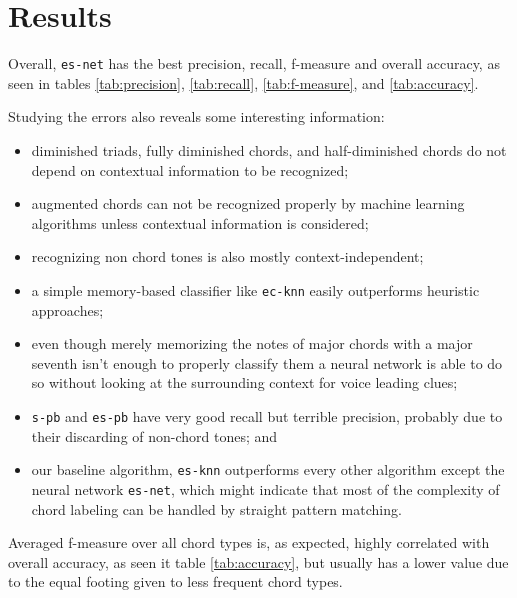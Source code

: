 \documentclass{article}
\begin{document}
\section{Results}
\label{sec:discussion}


Overall, \texttt{es-net} has the best precision, recall, f-measure and
overall accuracy, as seen in tables \ref{tab:precision},
\ref{tab:recall}, \ref{tab:f-measure}, and \ref{tab:accuracy}.

Studying the errors also reveals some interesting information:
\begin{itemize}
\item diminished triads, fully diminished chords, and half-diminished
  chords do not depend on contextual information to be recognized;
\item augmented chords can not be recognized properly by machine
  learning algorithms unless contextual information is considered;
\item recognizing non chord tones is also mostly context-independent;
\item a simple memory-based classifier like \texttt{ec-knn} easily
  outperforms heuristic approaches;
\item even though merely memorizing the notes of major chords with a
  major seventh isn't enough to properly classify them a neural
  network is able to do so without looking at the surrounding context
  for voice leading clues;
\item \texttt{s-pb} and \texttt{es-pb} have very good recall but
  terrible precision, probably due to their discarding of non-chord
  tones; and
\item our baseline algorithm, \texttt{es-knn} outperforms every other
  algorithm except the neural network \texttt{es-net}, which might
  indicate that most of the complexity of chord labeling can be
  handled by straight pattern matching.
\end{itemize}

Averaged f-measure over all chord types is, as expected, highly
correlated with overall accuracy, as seen it table \ref{tab:accuracy},
but usually has a lower value due to the equal footing given to less
frequent chord types.
\end{document}
